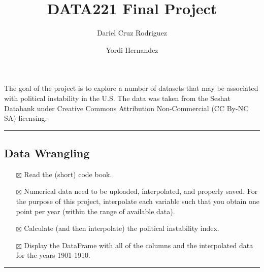 \documentclass[
  letterpaper,
  DIV=11,
  numbers=noendperiod]{scrartcl}
\title{DATA221 Final Project}
\author{Dariel Cruz Rodriguez \and Yordi Hernandez}
\date{}
\providecommand{\tightlist}{%
  \setlength{\itemsep}{0pt}\setlength{\parskip}{0pt}}\usepackage{longtable,booktabs,array}
\begin{document}
\maketitle


The goal of the project is to explore a number of datasets that may be
associated with political instability in the U.S. The data was taken
from the Seshat Databank under Creative Commons Attribution
Non-Commercial (CC By-NC SA) licensing.

\begin{center}\rule{0.5\linewidth}{0.5pt}\end{center}

\subsection{Data Wrangling}\label{data-wrangling}

\begin{itemize}
\tightlist
\item[$\boxtimes$]
  Read the (short) code book.
\item[$\boxtimes$]
  Numerical data need to be uploaded, interpolated, and properly saved.
  For the purpose of this project, interpolate each variable such that
  you obtain one point per year (within the range of available data).
\item[$\boxtimes$]
  Calculate (and then interpolate) the political instability index.
\item[$\boxtimes$]
  Display the DataFrame with all of the columns and the interpolated
  data for the years 1901-1910.
\end{itemize}

\begin{center}\rule{0.5\linewidth}{0.5pt}\end{center}
\end{document}
